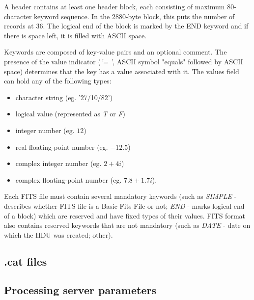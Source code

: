 	A header contains at least one header block, each consisting of maximum 80-character keyword sequence. In the 2880-byte block, this puts the number of records at 36. The logical end of the block is marked by the END keyword and if there is space left, it is filled with ASCII space.
	
	Keywords are composed of key-value pairs and an optional comment. The presence of the value indicator (\emph{'= '}, ASCII symbol "equals" followed by ASCII space) determines that the key has a value associated with it. The values field can hold any of the following types:
	
	\begin{itemize}
		\item character string (eg. '27/10/82')
		\item logical value (represented as \emph{T} or \emph{F})
		\item integer number (eg. $12$)
		\item real floating-point number (eg. $-12.5$)
		\item complex integer number (eg. $2+4i$)
		\item complex floating-point number (eg. $7.8+1.7i$).
	\end{itemize}
	
	 Each FITS file must contain several mandatory keywords (such as \emph{SIMPLE} - describes whether FITS file is a Basic Fits File or not; \emph{END} - marks logical end of a block) which are reserved and have fixed types of their values. FITS format also contains reserved keywords that are not mandatory (such as \emph{DATE} - date on which the HDU was created; other).

\subsection{.cat files}\label{sec:cat_files}
\subsection{Processing server parameters}\label{sec:server_param}